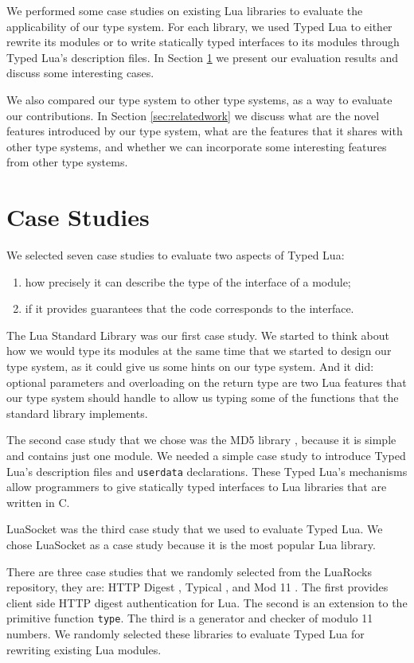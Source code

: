 
We performed some case studies on existing Lua libraries
to evaluate the applicability of our type system.
For each library, we used Typed Lua to either rewrite its modules
or to write statically typed interfaces to its modules through
Typed Lua's description files.
In Section \ref{sec:cases} we present our evaluation results
and discuss some interesting cases.

We also compared our type system to other type systems,
as a way to evaluate our contributions.
In Section \ref{sec:relatedwork} we discuss what are the novel
features introduced by our type system,
what are the features that it shares with other type systems,
and whether we can incorporate some interesting features from
other type systems.

\section{Case Studies}
\label{sec:cases}

We selected seven case studies to evaluate two aspects of Typed Lua:
\begin{enumerate}
\item how precisely it can describe the type of the interface of a module;
\item if it provides guarantees that the code corresponds to the interface.
\end{enumerate}

The Lua Standard Library \citep{luamanual} was our first case study.
We started to think about how we would type its modules at the same time
that we started to design our type system, as it could give us some
hints on our type system.
And it did: optional parameters and overloading on the return type
are two Lua features that our type system should handle to allow us
typing some of the functions that the standard library implements.

The second case study that we chose was the MD5 library \citep{lmd5},
because it is simple and contains just one module.
We needed a simple case study to introduce Typed Lua's description
files and \texttt{userdata} declarations.
These Typed Lua's mechanisms allow programmers to give statically typed
interfaces to Lua libraries that are written in C.

LuaSocket \citep{luasocket} was the third case study that we used to
evaluate Typed Lua.
We chose LuaSocket as a case study because it is the most popular Lua library.

There are three case studies that we randomly selected from the LuaRocks
repository, they are: HTTP Digest \citep{luahttpdigest},
Typical \citep{luatypical}, and Mod 11 \citep{luamod11}.
The first provides client side HTTP digest authentication for Lua.
The second is an extension to the primitive function \texttt{type}.
The third is a generator and checker of modulo 11 numbers.
We randomly selected these libraries to evaluate Typed Lua for
rewriting existing Lua modules.

